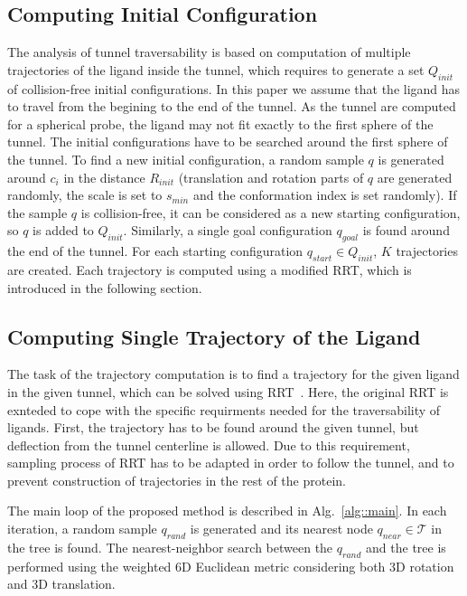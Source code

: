 \documentclass{svmult}
\def\qrand{q_{rand}}
\def\qstart{q_{start}}
\def\qinit{\qstart}
\def\qgoal{q_{goal}}
\def\qnear{q_{near}}
\def\T{\mathcal{T}}
\def\QI{Q_{init}}
\def\RI{R_{init}}
\def\rv{R_{tunnel}}
\def\smin{s_{min}}
\begin{document}
\subsection{Computing Initial Configuration}

The analysis of tunnel traversability is based on computation of multiple trajectories of the ligand inside the tunnel, which
requires to generate a set $\QI$ of collision-free initial configurations.
In this paper we assume that the ligand has to travel from the begining to the end of the tunnel.
As the tunnel are computed for a spherical probe, the ligand may not fit exactly to the first sphere of the tunnel.
The initial configurations have to be searched around the first sphere of the tunnel.
To find a new initial configuration, a random sample $q$ is generated around $c_i$ in the distance $\RI$ (translation and rotation
 parts of $q$ are generated randomly, the scale is set to $\smin$ and the conformation index is set randomly).
If the sample $q$ is collision-free, it can be considered as a new starting configuration, so $q$ is added to $\QI$.
Similarly, a single goal configuration $\qgoal$ is found around the end of the tunnel. 
For each starting configuration $\qinit \in \QI$,  $K$ trajectories are created.
Each trajectory is computed using a modified RRT, which is introduced in the following section.


\subsection{Computing Single Trajectory of the Ligand}

The task of the trajectory computation is to find a trajectory for the given ligand in the given tunnel, which can be solved
using RRT~\cite{lavalleRRT}.
Here, the original RRT is exnteded to cope with the specific requirments needed for the traversability of ligands.
First, the trajectory has to be found around the given tunnel, but deflection from the tunnel centerline is allowed.
Due to this requirement, sampling process of RRT has to be adapted in order to follow the tunnel, and to prevent
construction of trajectories in the rest of the protein.

The main loop of the proposed method is described in Alg.~\ref{alg::main}.
In each iteration, a random sample $\qrand$ is generated and its nearest node $\qnear\in\T$ in the tree is found.
The nearest-neighbor search between the $\qrand$ and the tree is performed using the weighted 6D Euclidean metric considering
both 3D rotation and 3D translation.
\end{document}
